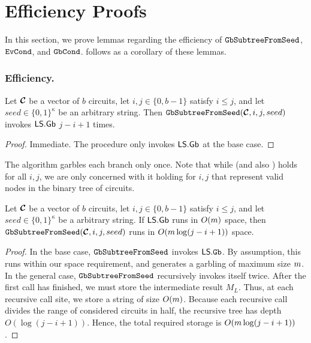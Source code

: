 \section{Efficiency Proofs}\label{supp:effproofs}

In this section, we prove lemmas regarding the efficiency of
$\mathtt{GbSubtreeFromSeed}$, $\mathtt{EvCond}$, and $\mathtt{GbCond}$.
 follows as a corollary of these lemmas.

\subsubsection{\gbtree Efficiency.}

\begin{lemma}\label{lemma:gbtreetime}
  Let $\vec{\cir}$ be a vector of $b$ circuits,
  let $i, j \in \{0, b-1\}$ satisfy $i \leq j$,
  and let $seed \in \{0, 1\}^\kappa$ be an arbitrary string.
  Then $\gbtree(\vec \cir, i, j, seed)$ invokes $\textsf{LS}.\textsf{Gb}$ $j - i + 1$ times.
\end{lemma}
\begin{proof}
  Immediate. The procedure only invokes $\textsf{LS}.\textsf{Gb}$ at the base case.
\end{proof}
The algorithm garbles each branch only once.
Note that while  (and also
) holds for all $i, j$, we are
only concerned with it holding for $i, j$ that represent valid nodes
in the binary tree of circuits.


\begin{lemma}\label{lemma:gbtreespace}
  Let $\vec{\cir}$ be a vector of $b$ circuits,
  let $i, j \in \{0, b-1\}$ satisfy $i \leq j$,
  and let $seed \in \{0, 1\}^\kappa$ be a arbitrary string.
  If $\textsf{LS}.\mathsf{Gb}$ runs in $O(m)$ space,
  then $\gbtree(\vec \cir, i, j, seed)$ runs in $O(m \log (j-i+1))$ space.
\end{lemma}
\begin{proof}
  In the base case, $\mathtt{GbSubtreeFromSeed}$ invokes $\textsf{LS}.\mathtt{Gb}$. By assumption, this runs
  within our space requirement, and generates a garbling of maximum
  size $m$.
  In the general case, $\mathtt{GbSubtreeFromSeed}$ recursively invokes itself twice.
  After the first call has finished, we must store the
  intermediate result $M_L$.
  Thus, at each recursive call site, we store a string of size
  $O(m)$.
  Because each recursive call divides the range of considered circuits
  in half, the recursive tree has depth $O(\log(j-i+1))$.
  Hence, the total required storage is $O(m \log(j-i+1))$.
\end{proof}



